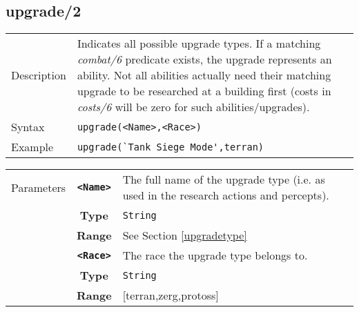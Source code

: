 \subsection{upgrade/2}
\begin{tabularx}{\textwidth}{lX}
 Description & Indicates all possible upgrade types. If a matching \textit{combat/6} predicate exists, the upgrade represents an ability. Not all abilities actually need their matching upgrade to be researched at a building first (costs in \textit{costs/6} will be zero for such abilities/upgrades). \\
 Syntax & \verb|upgrade(<Name>,<Race>)| \\
 Example & \verb|upgrade(`Tank Siege Mode',terran)| \\
 \end{tabularx}
 \begin{tabularx}{\textwidth}{l | c | p{8cm}|}
 \cline{2-3}
 Parameters & \textbf{\verb|<Name>|} & The full name of the upgrade type (i.e. as used in the research actions and percepts). \\
            & \textbf{Type} & \verb|String| \\
            & \textbf{Range} & See Section \ref{upgradetype} \\
            \cline{2-3}
 			& \textbf{\verb|<Race>|} & The race the upgrade type belongs to.\\
            & \textbf{Type} & \verb|String| \\
            & \textbf{Range} & [terran,zerg,protoss] \\
            \cline{2-3}
\end{tabularx}


